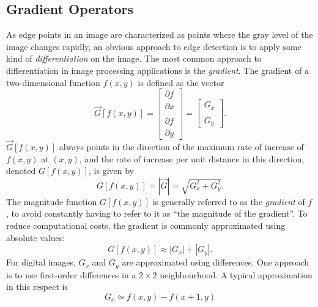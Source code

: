 \subsection{Gradient Operators}
\label{image:edge:gradient}

As edge points in an image are characterized as points where the gray
level of the image changes rapidly, an obvious approach to edge
detection is to apply some kind of {\em differentiation\/} on the
image.  The most common approach to differentiation in image
processing applications is the {\em gradient\/}.  The gradient of a
two-dimensional function $f(x,y)$ is defined as the vector
\begin{equation}
  \vec{G}[f(x,y)]=\left[
    \begin{array}{c}
      \underline{\partial f} \\
      \partial x \\ \\
      \underline{\partial f} \\
      \partial y
    \end{array}\right]=\left[
    \begin{array}{c}
      G_{x} \\ \\
      G_{y}
    \end{array}\right]\mbox{.}
\end{equation}
$\vec{G}[f(x,y)]$ always points in the direction of the maximum rate
of increase of $f(x,y)$ at $(x,y)$, and the rate of increase per unit
distance in this direction, denoted $G[f(x,y)]$, is given by
\begin{equation}
\label{eq:gradient:sqrt}
  G[f(x,y)]=|\vec{G}|=\sqrt{G_{x}^{2}+G_{y}^{2}}\mbox{.}
\end{equation}
The magnitude function $G[f(x,y)]$ is generally referred to as the
{\em gradient\/} of $f$, to avoid constantly having to refer to it as
``the magnitude of the gradient''.  To reduce computational costs, the
gradient is commonly approximated using absolute values:
\begin{equation}
\label{eq:gradient:abs}
  G[f(x,y)]\approx|G_{x}|+|G_{y}|\mbox{.}
\end{equation}
For digital images, $G_{x}$ and $G_{y}$ are approximated using
differences.  One approach is to use first-order differences in a
$2\times 2$ neighbourhood.  A typical approximation in this respect is
\begin{equation}
  G_{x}\simeq f(x,y)-f(x+1,y)
\end{equation}
